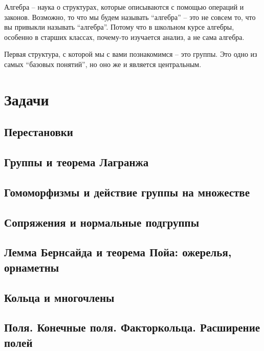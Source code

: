 \documentclass[10pt, twoside]{article}
\begin{document}
\pagestyle{empty}

\newpage

\tableofcontents
\newpage

\setcounter{page}{1}
\pagestyle{fancy}

Алгебра -- наука о структурах, которые описываются с помощью операций и законов. 
Возможно, то что мы будем называть ``алгебра'' -- это не совсем то, что вы привыкли называть ``алгебра''. 
Потому что в школьном курсе алгебры, особенно в старших классах, почему-то изучается анализ, а не сама алгебра.

Первая структура, с которой мы с вами познакомимся -- это группы.
Это одно из самых ``базовых понятий'', но оно же и является центральным. 












\newpage
\renewcommand{\thesubsection}{\roman{subsection}}
\setcounter{subsection}{0}

\section*{Задачи}
\subsection{Перестановки}

\subsection{Группы и теорема Лагранжа}

\subsection{Гомоморфизмы и действие группы на множестве}
%
\subsection{Сопряжения и нормальные подгруппы}
%
\subsection{Лемма Бернсайда и теорема Пойа: ожерелья, орнаметны}
%
\subsection{Кольца и многочлены}
%
\subsection{Поля. Конечные поля. Факторкольца. Расширение полей} %
%
%
\end{document}
